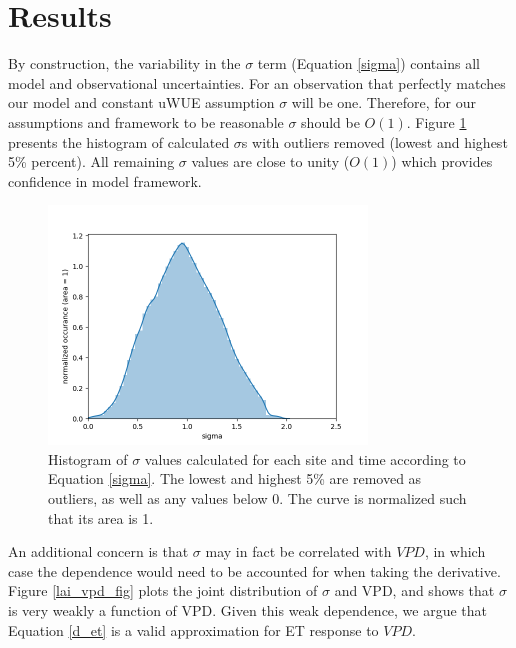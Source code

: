 \documentclass[draft,linenumbers]{agujournal}
\begin{document}
\section{Results}
\label{results}

By construction, the variability in the $\sigma$ term (Equation \ref{sigma}) contains all model and observational uncertainties. For an observation that perfectly matches our model and constant uWUE assumption $\sigma$ will be one. Therefore, for our assumptions and framework to be reasonable $\sigma$ should be $O(1)$. Figure \ref{lai_fig} presents the histogram of calculated $\sigma$s with outliers removed (lowest and highest 5\% percent). All remaining $\sigma$ values are close to unity ($O(1)$) which provides confidence in model framework.

\begin{figure}[h]
\centering
\includegraphics[width=20pc]{./fig02.png}
\caption{Histogram of $\sigma$ values calculated for each site and time according to Equation \ref{sigma}. The lowest and highest 5\% are removed as outliers, as well as any values below 0. The curve is normalized such that its area is 1. }
\label{lai_fig}
\end{figure}

An additional concern is that $\sigma$ may in fact be correlated with $VPD$, in which case the dependence would need to be accounted for when taking the derivative. Figure \ref{lai_vpd_fig} plots the joint distribution of $\sigma$ and VPD, and shows that $\sigma$ is very weakly a function of VPD. Given this weak dependence, we argue that Equation \ref{d_et} is a valid approximation for ET response to $VPD$.
\end{document}
